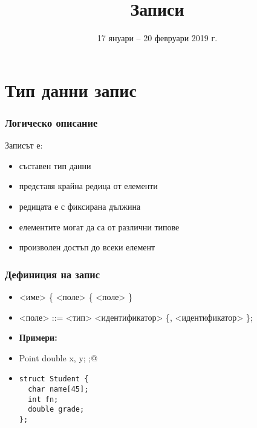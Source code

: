 \documentclass[alsotrans]{beamerswitch}
\title{Записи}
\date[17.01--20.02.2019 г.]{17 януари -- 20 февруари 2019 г.}
\begin{document}
\begin{frame}
  \titlepage
\end{frame}

\section{Тип данни запис}


\begin{frame}
  \frametitle{Логическо описание}

Записът е:
\begin{itemize}[<+->]
\item съставен тип данни
\item представя крайна редица от елементи
\item редицата е с \alert<6>{фиксирана дължина}
\item елементите могат да са от \alert<6>{различни типове}
\item произволен достъп до всеки елемент
\end{itemize}
\end{frame}

\begin{frame}[fragile]
  \frametitle{Дефиниция на запис}

  \begin{itemize}[<+->]
  \item {} <име> \tta\{ <поле> \{ <поле> \} \tta{\};}
  \item{} <поле> ::= <тип> <идентификатор> \{\tta, <идентификатор> \}\tta;
  \item \textbf{Примери:}
  \item \lst@struct Point { double x, y; };@
  \item
\begin{lstlisting}
struct Student {
  char name[45];
  int fn;
  double grade;
};
\end{lstlisting}
  \end{itemize}
\end{frame}
\end{document}

